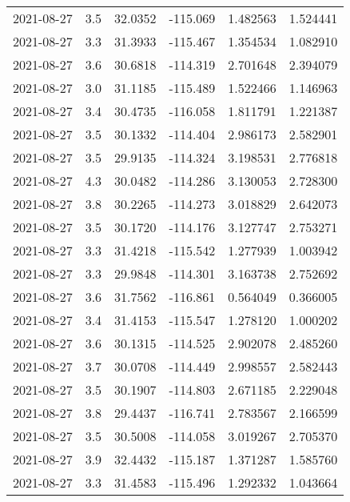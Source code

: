 \begin{tabular}{lrrrrr}
2021-08-27 &       3.5 &  32.0352 &  -115.069 &         1.482563 &         1.524441 \\
2021-08-27 &       3.3 &  31.3933 &  -115.467 &         1.354534 &         1.082910 \\
2021-08-27 &       3.6 &  30.6818 &  -114.319 &         2.701648 &         2.394079 \\
2021-08-27 &       3.0 &  31.1185 &  -115.489 &         1.522466 &         1.146963 \\
2021-08-27 &       3.4 &  30.4735 &  -116.058 &         1.811791 &         1.221387 \\
2021-08-27 &       3.5 &  30.1332 &  -114.404 &         2.986173 &         2.582901 \\
2021-08-27 &       3.5 &  29.9135 &  -114.324 &         3.198531 &         2.776818 \\
2021-08-27 &       4.3 &  30.0482 &  -114.286 &         3.130053 &         2.728300 \\
2021-08-27 &       3.8 &  30.2265 &  -114.273 &         3.018829 &         2.642073 \\
2021-08-27 &       3.5 &  30.1720 &  -114.176 &         3.127747 &         2.753271 \\
2021-08-27 &       3.3 &  31.4218 &  -115.542 &         1.277939 &         1.003942 \\
2021-08-27 &       3.3 &  29.9848 &  -114.301 &         3.163738 &         2.752692 \\
2021-08-27 &       3.6 &  31.7562 &  -116.861 &         0.564049 &         0.366005 \\
2021-08-27 &       3.4 &  31.4153 &  -115.547 &         1.278120 &         1.000202 \\
2021-08-27 &       3.6 &  30.1315 &  -114.525 &         2.902078 &         2.485260 \\
2021-08-27 &       3.7 &  30.0708 &  -114.449 &         2.998557 &         2.582443 \\
2021-08-27 &       3.5 &  30.1907 &  -114.803 &         2.671185 &         2.229048 \\
2021-08-27 &       3.8 &  29.4437 &  -116.741 &         2.783567 &         2.166599 \\
2021-08-27 &       3.5 &  30.5008 &  -114.058 &         3.019267 &         2.705370 \\
2021-08-27 &       3.9 &  32.4432 &  -115.187 &         1.371287 &         1.585760 \\
2021-08-27 &       3.3 &  31.4583 &  -115.496 &         1.292332 &         1.043664 \\

\end{tabular}
